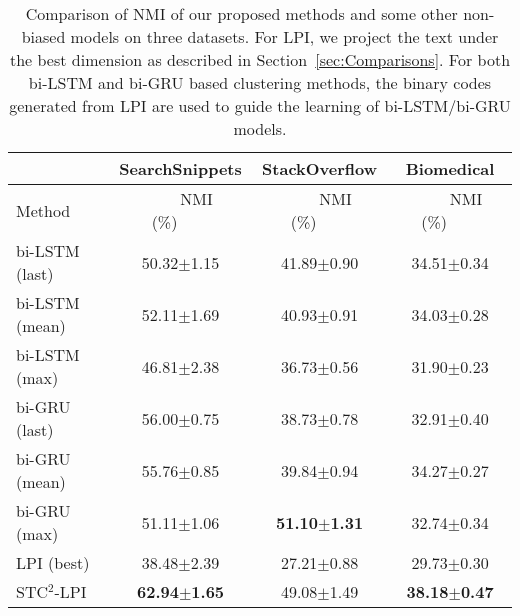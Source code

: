 \documentclass[review]{elsarticle}
\begin{document}
\begin{table*}[t] \begin{center}
\begin{tabular}{|l|c|c|c|}\hline
&SearchSnippets &StackOverflow &Biomedical\\\hline
Method      &~~~~NMI (\%)~~~~&~~~~NMI (\%)~~~~&~~~~NMI (\%)~~~~\\\hline \hline
bi-LSTM (last)& 50.32$\pm$1.15        & 41.89$\pm$0.90  & 34.51$\pm$0.34    \\
bi-LSTM (mean)& 52.11$\pm$1.69    & 40.93$\pm$0.91  & 34.03$\pm$0.28 \\
bi-LSTM (max) & 46.81$\pm$2.38     	&36.73$\pm$0.56	  &31.90$\pm$0.23\\
bi-GRU (last)& 56.00$\pm$0.75        & 38.73$\pm$0.78  & 32.91$\pm$0.40    \\
bi-GRU (mean)& 55.76$\pm$0.85    & 39.84$\pm$0.94  & 34.27$\pm$0.27 \\
bi-GRU (max) & 51.11$\pm$1.06     &	{\bf{51.10$\pm$1.31}}	  &32.74$\pm$0.34\\
\hline
LPI (best)&  38.48$\pm$2.39	& 27.21$\pm$0.88        &29.73$\pm$0.30\\
STC$^2$-LPI&	{\bf{62.94$\pm$1.65}}	& 49.08$\pm$1.49 &{\bf{38.18$\pm$0.47}}\\\hline

\end{tabular}
\end{center}
\caption{\label{tb:ComparisonNMI_BIRNN} Comparison of NMI of our proposed methods and some other non-biased models on three datasets. For LPI, we project the text under the best dimension as described in Section~\ref{sec:Comparisons}. For both bi-LSTM and bi-GRU based clustering methods, the binary codes generated from LPI are used to guide the learning of bi-LSTM/bi-GRU models.}
\end{table*}
\end{document}
